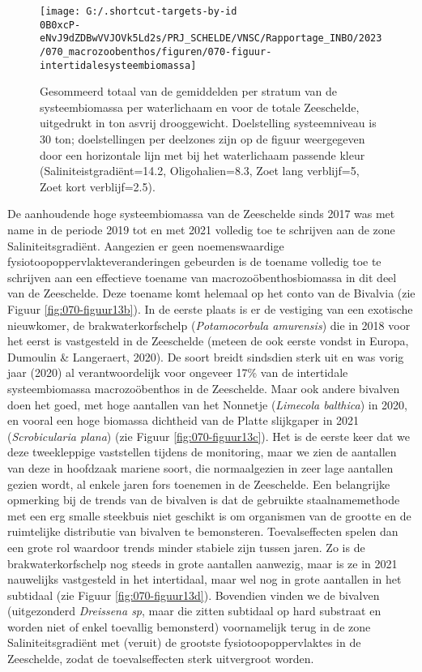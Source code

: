 \documentclass[twoside]{extreport}
\begin{document}
\begin{figure}[H]

{\centering \texttt{[image: G:/.shortcut-targets-by-id\\0B0xcP-eNvJ9dZDBwVVJOVk5Ld2s/PRJ\_SCHELDE/VNSC/Rapportage\_INBO/2023/070\_macrozoobenthos/figuren/070-figuur-intertidalesysteembiomassa]} 

}

\caption{Gesommeerd totaal van de gemiddelden per stratum van de systeembiomassa per waterlichaam en voor de totale Zeeschelde, uitgedrukt in ton asvrij drooggewicht.
Doelstelling systeemniveau is 30 ton; doelstellingen per deelzones zijn op de figuur weergegeven door een horizontale lijn met bij het waterlichaam passende kleur (Saliniteistgradiënt=14.2, Oligohalien=8.3, Zoet lang verblijf=5, Zoet kort verblijf=2.5).}\label{fig:070-figuur13}
\end{figure}

De aanhoudende hoge systeembiomassa van de Zeeschelde sinds 2017 was met
name in de periode 2019 tot en met 2021 volledig toe te schrijven aan de
zone Saliniteitsgradiënt. Aangezien er geen noemenswaardige
fysiotoopoppervlakteveranderingen gebeurden is de toename volledig toe
te schrijven aan een effectieve toename van macrozoöbenthosbiomassa in
dit deel van de Zeeschelde. Deze toename komt helemaal op het conto van
de Bivalvia (zie Figuur \ref{fig:070-figuur13b}). In de eerste plaats is
er de vestiging van een exotische nieuwkomer, de brakwaterkorfschelp
(\emph{Potamocorbula amurensis}) die in 2018 voor het eerst is
vastgesteld in de Zeeschelde (meteen de ook eerste vondst in Europa,
Dumoulin \& Langeraert, 2020). De soort breidt sindsdien sterk uit en
was vorig jaar (2020) al verantwoordelijk voor ongeveer 17\% van de
intertidale systeembiomassa macrozoöbenthos in de Zeeschelde. Maar ook
andere bivalven doen het goed, met hoge aantallen van het Nonnetje
(\emph{Limecola balthica}) in 2020, en vooral een hoge biomassa
dichtheid van de Platte slijkgaper in 2021 (\emph{Scrobicularia plana})
(zie Figuur \ref{fig:070-figuur13c}). Het is de eerste keer dat we deze
tweekleppige vaststellen tijdens de monitoring, maar we zien de
aantallen van deze in hoofdzaak mariene soort, die normaalgezien in zeer
lage aantallen gezien wordt, al enkele jaren fors toenemen in de
Zeeschelde. Een belangrijke opmerking bij de trends van de bivalven is
dat de gebruikte staalnamemethode met een erg smalle steekbuis niet
geschikt is om organismen van de grootte en de ruimtelijke distributie
van bivalven te bemonsteren. Toevalseffecten spelen dan een grote rol
waardoor trends minder stabiele zijn tussen jaren. Zo is de
brakwaterkorfschelp nog steeds in grote aantallen aanwezig, maar is ze
in 2021 nauwelijks vastgesteld in het intertidaal, maar wel nog in grote
aantallen in het subtidaal (zie Figuur \ref{fig:070-figuur13d}).
Bovendien vinden we de bivalven (uitgezonderd \emph{Dreissena sp}, maar
die zitten subtidaal op hard substraat en worden niet of enkel toevallig
bemonsterd) voornamelijk terug in de zone Saliniteitsgradiënt met
(veruit) de grootste fysiotoopoppervlaktes in de Zeeschelde, zodat de
toevalseffecten sterk uitvergroot worden.
\end{document}
